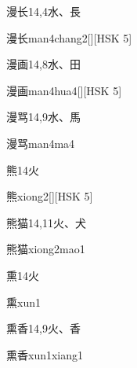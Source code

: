 \begin{entry}{漫长}{14,4}{⽔、⾧}
  \begin{phonetics}{漫长}{man4chang2}[][HSK 5]
  \end{phonetics}
\end{entry}

\begin{entry}{漫画}{14,8}{⽔、⽥}
  \begin{phonetics}{漫画}{man4hua4}[][HSK 5]
  \end{phonetics}
\end{entry}

\begin{entry}{漫骂}{14,9}{⽔、⾺}
  \begin{phonetics}{漫骂}{man4ma4}
  \end{phonetics}
\end{entry}

\begin{entry}{熊}{14}{⽕}
  \begin{phonetics}{熊}{xiong2}[][HSK 5]
  \end{phonetics}
\end{entry}

\begin{entry}{熊猫}{14,11}{⽕、⽝}
  \begin{phonetics}{熊猫}{xiong2mao1}
  \end{phonetics}
\end{entry}

\begin{entry}{熏}{14}{⽕}
  \begin{phonetics}{熏}{xun1}
  \end{phonetics}
\end{entry}

\begin{entry}{熏香}{14,9}{⽕、⾹}
  \begin{phonetics}{熏香}{xun1xiang1}
  \end{phonetics}
\end{entry}

